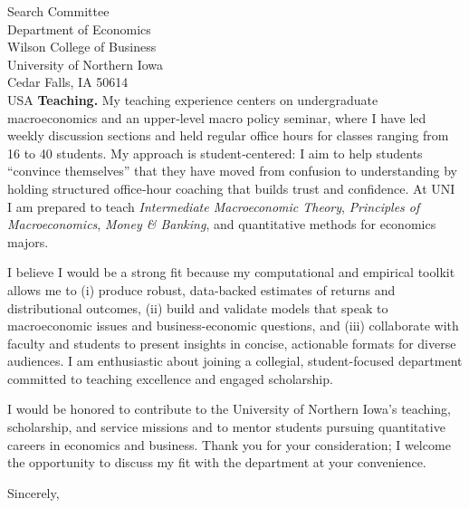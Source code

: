 \documentclass[11pt,letterpaper]{letter}
\begin{document}
\begin{letter}{Search Committee \\
Department of Economics \\
Wilson College of Business \\
University of Northern Iowa \\
Cedar Falls, IA 50614 \\ USA}
\textbf{Teaching.} My teaching experience centers on undergraduate macroeconomics and an upper‐level macro policy seminar, where I have led weekly discussion sections and held regular office hours for classes ranging from 16 to 40 students. My approach is student‐centered: I aim to help students “convince themselves” that they have moved from confusion to understanding by holding structured office‐hour coaching that builds trust and confidence. At UNI I am prepared to teach \textit{Intermediate Macroeconomic Theory}, \textit{Principles of Macroeconomics}, \textit{Money \& Banking}, and quantitative methods for economics majors. 

I believe I would be a strong fit because my computational and empirical toolkit allows me to (i) produce robust, data-backed estimates of returns and distributional outcomes, (ii) build and validate models that speak to macroeconomic issues and business-economic questions, and (iii) collaborate with faculty and students to present insights in concise, actionable formats for diverse audiences. I am enthusiastic about joining a collegial, student-focused department committed to teaching excellence and engaged scholarship.

I would be honored to contribute to the University of Northern Iowa’s teaching, scholarship, and service missions and to mentor students pursuing quantitative careers in economics and business. Thank you for your consideration; I welcome the opportunity to discuss my fit with the department at your convenience.

\closing{Sincerely,}

\end{letter}
\end{document}
